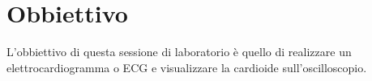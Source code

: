 \section*{Obbiettivo}

L'obbiettivo di questa sessione di laboratorio è quello di realizzare un elettrocardiogramma o ECG e visualizzare la cardioide sull'oscilloscopio.

